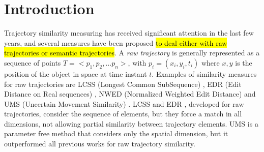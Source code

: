 \documentclass[12pt]{article}
\providecommand{\keywords}[1]
{
  \small    
  \textbf{\textit{Keywords---}} #1
}
\begin{document}
 




\section{Introduction}
Trajectory similarity measuring has received significant attention in the last few years, and several measures have been proposed \hl{to deal either with raw trajectories or semantic trajectories}. A \emph{raw trajectory} is generally represented as a sequence of points $T=<p_1, p_2, ...p_n>$, with $p_i=(x_i,y_i,t_i)$ where $x,y$ is the position of the object in space at time instant $t$.  Examples of similarity measures for raw trajectories are LCSS (Longest Common SubSequence) \citep{vlachos2002discovering}, EDR (Edit Distance on Real sequences) \citep{Chen:2005:RFS:1066157.1066213}, NWED (Normalized Weighted Edit Distance) \citep{dodge2012} and UMS (Uncertain Movement Similarity) \citep{Furtado-UMS-2018}. LCSS \citep{vlachos2002discovering} and EDR \citep{Chen:2005:RFS:1066157.1066213}, developed for raw trajectories, consider the sequence of elements, but they force a match in all dimensions, not allowing partial similarity between trajectory elements.  %
UMS \citep{Furtado-UMS-2018} is a parameter free method that considers only the spatial dimension, but it outperformed all previous works for raw trajectory similarity.
\end{document}
